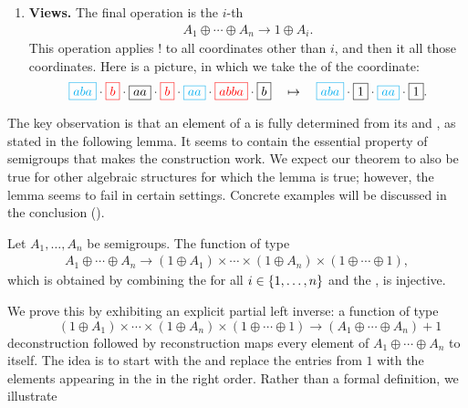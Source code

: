 \begin{enumerate}
        \item \AP \textbf{Views.} The final operation is the $i$-th 
        \begin{align*}
        A_1 \oplus \cdots \oplus A_n \to 1 \oplus A_i.
        \end{align*}
        This operation applies $!$ to all coordinates other than $i$, and then it  all those coordinates. Here is a picture, in which we take the  of the  coordinate:
        \begin{align*}
            {\color{cyan}\boxed{aba}} \cdot 
            {\color{red}\boxed{b}} \cdot 
            \boxed{aa} \cdot 
            {\color{red}\boxed{b}} \cdot 
            {\color{cyan}\boxed{aa}} \cdot 
            {\color{red}\boxed{abba}} \cdot 
            \boxed{b}
            \quad \mapsto \quad  
            {\color{cyan}\boxed{aba}} \cdot 
            {\boxed{1}} \cdot 
            {\color{cyan}\boxed{aa}} \cdot 
            \boxed{1}.
        \end{align*}
\end{enumerate}
The key observation is that an element of a  is fully determined
from its  and , as stated in the following lemma.
It seems to contain the essential property of semigroups that makes the
construction work. We expect our theorem to also be true for other algebraic
structures for which the lemma is true; however, the lemma seems to fail in
certain settings. Concrete examples will be discussed in the conclusion ().
\begin{lemma}
\label{lem:views} Let $A_1,\ldots,A_n$ be semigroups. The  function of type
\begin{align*}
A_1 \oplus \cdots \oplus A_n \longrightarrow (1 \oplus A_1) \times \cdots \times (1 \oplus A_n) \times (1 \oplus \cdots \oplus 1),
\end{align*}
which is obtained by combining the  for all $i \in \{1,\ldots,n\}$ and the , is injective. 
\end{lemma}
\AP We prove this by exhibiting an explicit partial left inverse: a
 function of type
\[ \qquad (1 \oplus A_1) \times \cdots \times (1 \oplus A_n) \times (1 \oplus
  \cdots \oplus 1) \longrightarrow (A_1 \oplus \cdots \oplus A_n) + 1 \]
deconstruction followed by reconstruction maps every element of $A_1
\oplus \cdots \oplus A_n$ to itself. The idea is to start with the 
and replace the entries from $1$ with the elements appearing in the
 in the right order. Rather than a formal definition, we illustrate
